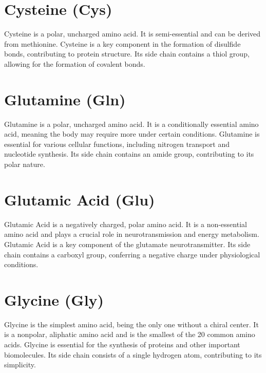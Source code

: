 \documentclass{article}
\begin{document}
\section*{Cysteine (Cys)}
Cysteine is a polar, uncharged amino acid. It is semi-essential and can be derived from methionine. Cysteine is a key component in the formation of disulfide bonds, contributing to protein structure. Its side chain contains a thiol group, allowing for the formation of covalent bonds.
\begin{center}
\end{center}
\section*{Glutamine (Gln)}
Glutamine is a polar, uncharged amino acid. It is a conditionally essential amino acid, meaning the body may require more under certain conditions. Glutamine is essential for various cellular functions, including nitrogen transport and nucleotide synthesis. Its side chain contains an amide group, contributing to its polar nature.
\begin{center}
\end{center}

\section*{Glutamic Acid (Glu)}
Glutamic Acid is a negatively charged, polar amino acid. It is a non-essential amino acid and plays a crucial role in neurotransmission and energy metabolism. Glutamic Acid is a key component of the glutamate neurotransmitter. Its side chain contains a carboxyl group, conferring a negative charge under physiological conditions.
\begin{center}
\end{center}

\section*{Glycine (Gly)}
Glycine is the simplest amino acid, being the only one without a chiral center. It is a nonpolar, aliphatic amino acid and is the smallest of the 20 common amino acids. Glycine is essential for the synthesis of proteins and other important biomolecules. Its side chain consists of a single hydrogen atom, contributing to its simplicity.
\begin{center}
\end{center}
\end{document}
